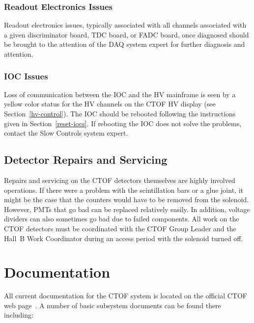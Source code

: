 \documentclass[12pt]{article}
\begin{document}
\subsubsection{Readout Electronics Issues}
\label{readout-issues}

Readout electronics issues, typically associated with all channels associated with a given
discriminator board, TDC board, or FADC board, once diagnosed should be brought to the
attention of the DAQ system expert for further diagnosis and attention.

\subsubsection{IOC Issues}
\label{ioc-issues}

Loss of communication between the IOC and the HV mainframe is seen by a yellow color status for
the HV channels on the CTOF HV display (see Section~\ref{hv-control}). The IOC should be rebooted 
following the instructions given in Section~\ref{reset-iocs}. If rebooting the IOC does not solve 
the problems, contact the Slow Controls system expert.

\subsection{Detector Repairs and Servicing}

Repairs and servicing on the CTOF detectors themselves are highly involved operations. If there 
were a problem with the scintillation bars or a glue joint, it might be the case that the 
counters would have to be removed from the solenoid. However, PMTs that go bad can be replaced 
relatively easily. In addition, voltage dividers can also sometimes go bad due to failed 
components. All work on the CTOF detectors must be coordinated with the CTOF Group Leader and 
the Hall~B Work Coordinator during an access period with the solenoid turned off.

\clearpage

\vfil
\eject

\section{Documentation}

All current documentation for the CTOF system is located on the official CTOF web page~\cite{ctof-web}. 
A number of basic subsystem documents can be found there including:
\end{document}
